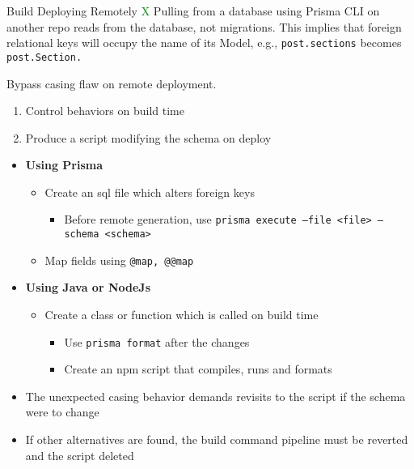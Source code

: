\documentclass[7px]{article}
\begin{document}
\frontmatter
{Build}
{Deploying Remotely}
{\textcolor{green}{X}}
{Pulling from a database using Prisma CLI on another repo reads from the database, not migrations. This implies that foreign relational keys will occupy the name of its Model, e.g., \texttt{post.sections} becomes \texttt{post.Section.}}

\strategy
{Bypass casing flaw on remote deployment.}
{
  \begin{enumerate}
    \item Control behaviors on build time
    \item Produce a script modifying the schema on deploy
  \end{enumerate}
}
{
  \begin{itemize}[label=\textsection]
    \item {\textbf{Using Prisma}}
      \small
      \begin{itemize}[label=$\multimapdotinv$, leftmargin=3mm]
        \item Create an sql file which alters foreign keys
          \footnotesize{
            \begin{itemize}[label=$\multimapinv$]
              \item Before remote generation, use \texttt{prisma execute --file <file> --schema <schema>}
            \end{itemize}
          }
        \item Map fields using \texttt{@map, @@map}
      \end{itemize}
    \item {\textbf{Using Java or NodeJs }}
      \small
      \begin{itemize}[label=$\multimapdotinv$, leftmargin=3mm]
        \item Create a class or function which is called on build time
          \footnotesize{
            \begin{itemize}[label=$\multimapinv$]
              \item Use \texttt{prisma format} after the changes
              \item Create an npm script that compiles, runs and formats
            \end{itemize}
          }
      \end{itemize}
      \small
  \end{itemize}
}
{
  \raggedright
  \begin{itemize}[label=\blitzb]
    \item The unexpected casing behavior demands revisits to the script if the schema were to change
    \item If other alternatives are found, the build command pipeline must be reverted and the script deleted
      \small
  \end{itemize}
}
\end{document}
